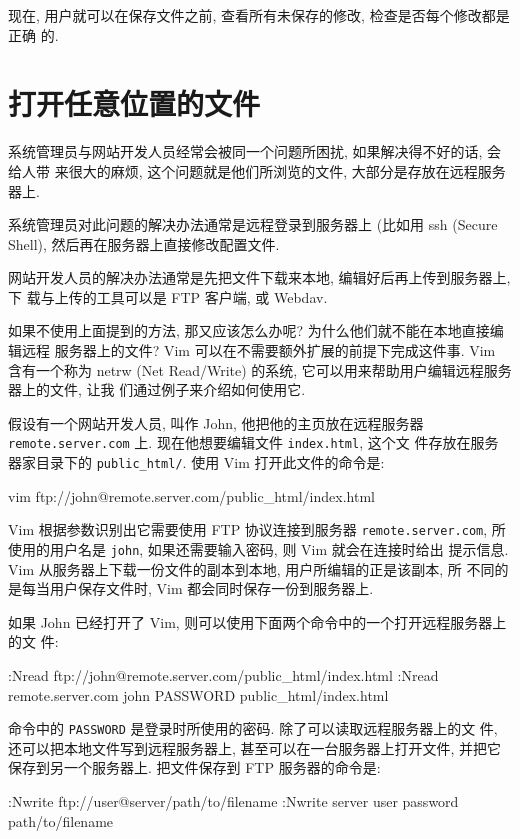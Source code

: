现在, 用户就可以在保存文件之前, 查看所有未保存的修改, 检查是否每个修改都是正确
的.

\section{打开任意位置的文件}
\label{sec:open_files_anywhere}

系统管理员与网站开发人员经常会被同一个问题所困扰, 如果解决得不好的话, 会给人带
来很大的麻烦, 这个问题就是他们所浏览的文件, 大部分是存放在远程服务器上.

系统管理员对此问题的解决办法通常是远程登录到服务器上 (比如用 ssh (Secure
Shell), 然后再在服务器上直接修改配置文件.

网站开发人员的解决办法通常是先把文件下载来本地, 编辑好后再上传到服务器上, 下
载与上传的工具可以是 FTP 客户端, 或 Webdav.

如果不使用上面提到的方法, 那又应该怎么办呢? 为什么他们就不能在本地直接编辑远程
服务器上的文件? Vim 可以在不需要额外扩展的前提下完成这件事. Vim 含有一个称为
netrw (Net Read/Write) 的系统, 它可以用来帮助用户编辑远程服务器上的文件, 让我
们通过例子来介绍如何使用它.

假设有一个网站开发人员, 叫作 John, 他把他的主页放在远程服务器
\texttt{remote.server.com} 上. 现在他想要编辑文件 \texttt{index.html}, 这个文
件存放在服务器家目录下的 \verb'public_html/'. 使用 Vim 打开此文件的命令是:
\begin{vimcode}
vim ftp://john@remote.server.com/public_html/index.html
\end{vimcode}

Vim 根据参数识别出它需要使用 FTP 协议连接到服务器 \texttt{remote.server.com},
所使用的用户名是 \texttt{john}, 如果还需要输入密码, 则 Vim 就会在连接时给出
提示信息. Vim 从服务器上下载一份文件的副本到本地, 用户所编辑的正是该副本, 所
不同的是每当用户保存文件时, Vim 都会同时保存一份到服务器上.

如果 John 已经打开了 Vim, 则可以使用下面两个命令中的一个打开远程服务器上的文
件:
\begin{vimcode}
:Nread ftp://john@remote.server.com/public_html/index.html
:Nread remote.server.com john PASSWORD public_html/index.html
\end{vimcode}
命令中的 \texttt{PASSWORD} 是登录时所使用的密码. 除了可以读取远程服务器上的文
件, 还可以把本地文件写到远程服务器上, 甚至可以在一台服务器上打开文件, 并把它
保存到另一个服务器上. 把文件保存到 FTP 服务器的命令是:
\begin{vimcode}
:Nwrite ftp://user@server/path/to/filename
:Nwrite server user password path/to/filename
\end{vimcode}

